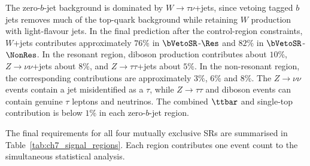 The zero-$b$-jet background is dominated by $W\to\tau\nu$+jets, since vetoing tagged $b$ jets removes much of the top-quark background while retaining $W$ production with light-flavour jets.
In the final prediction after the control-region constraints, $W$+jets contributes approximately $76\%$ in $\bVetoSR$-$\Res$ and $82\%$ in $\bVetoSR$-$\NonRes$.
In the resonant region, diboson production contributes about $10\%$, $Z\to\nu\nu$+jets about $8\%$, and $Z\to\tau\tau$+jets about $5\%$.
In the non-resonant region, the corresponding contributions are approximately $3\%$, $6\%$ and $8\%$.
The $Z\to\nu\nu$ events contain a jet misidentified as a $\tau$, while $Z\to\tau\tau$ and diboson events can contain genuine $\tau$ leptons and neutrinos.
The combined $\ttbar$ and single-top contribution is below $1\%$ in each zero-$b$-jet region.

The final requirements for all four mutually exclusive SRs are summarised in Table~\ref{tab:ch7_signal_regions}.
Each region contributes one event count to the simultaneous statistical analysis.

